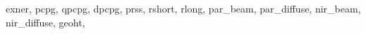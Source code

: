 \begin{DoxyCompactItemize}
                                                                                                                                                                                 exner,                                                                                                                                                                                                                                                                                       pcpg,                                                                                                                                                                                                                                                                                           qpcpg,                                                                                                                                                                                                                                                                                       dpcpg,                                                                                                                                                                                                                                                                                       prss,                                                                                                                                                                                                                                                                                           rshort,                                                                                                                                                                                                                                                                               rlong,                                                                                                                                                                                                                                                                                       par\+\_\+beam,                                                                                                                                                                                                                                                                           par\+\_\+diffuse,                                                                                                                                                                                                                                                               nir\+\_\+beam,                                                                                                                                                                                                                                                                           nir\+\_\+diffuse,                                                                                                                                                                                                                                                               geoht,                          
\end{DoxyCompactItemize}
